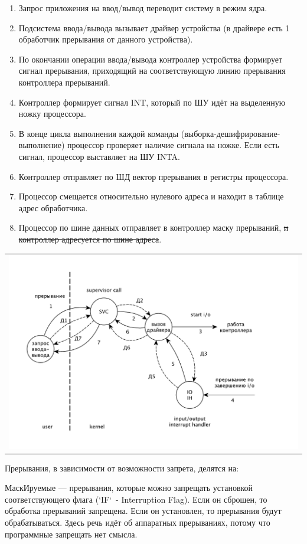\begin{enumerate}
	\item Запрос приложения на ввод/вывод переводит систему в режим ядра.
	\item Подсистема ввода/вывода вызывает драйвер устройства (в драйвере есть 1 обработчик прерывания от данного устройства).
	\item По окончании операции ввода/вывода контроллер устройства формирует сигнал прерывания, приходящий на соответствующую линию прерывания контроллера прерываний.
	\item Контроллер формирует сигнал INT, который по ШУ идёт на выделенную ножку процессора.
	\item В конце цикла выполнения каждой команды (выборка-дешифрирование-выполнение) процессор проверяет наличие сигнала на ножке. Если есть сигнал, процессор выставляет на ШУ INTA.
	\item Контроллер отправляет по ШД вектор прерывания в регистры процессора.
	\item Процессор смещается относительно нулевого адреса и находит в таблице адрес обработчика.
	\item Процессор по шине данных отправляет в контроллер маску прерываний, \sout{и контроллер адресуется по шине адреса}. 
\end{enumerate}

\begin{table}[h!]
  \centering
  \begin{tabular}{p{1\linewidth}}
    \centering
    \includegraphics[width=0.8\linewidth]{./images/driver.pdf}
  \end{tabular}
\end{table}

Прерывания, в зависимости от возможности запрета, делятся на:

МаскИруемые — прерывания, которые можно запрещать установкой соответствующего флага (`IF` - Interruption Flag). Если он сброшен, то обработка прерываний запрещена. Если он установлен, то прерывания будут обрабатываться. Здесь речь идёт об аппаратных прерываниях, потому что программные запрещать нет смысла.

